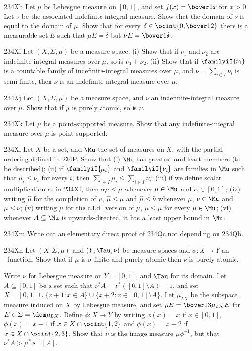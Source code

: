 {\spheader 234Xh
Let $\mu$ be Lebesgue measure on $[0,1]$, and set $f(x)=\bover1x$ for
$x>0$. Let $\nu$ be the associated indefinite-integral measure.   Show
that the
domain of $\nu$ is equal to the domain of $\mu$.   Show that for every
$\delta\in\ocint{0,\bover12}$ there is a measurable set $E$ such that
$\mu E=\delta$ but $\nu E=\bover1{\delta}$.

\spheader 234Xi
 Let $(X,\Sigma,\mu)$ be a measure space.   (i) Show that if
$\nu_1$ and $\nu_2$ are indefinite-integral measures over $\mu$, so is
$\nu_1+\nu_2$.   (ii) Show that if $\familyiI{\nu_i}$ is a countable family
of indefinite-integral measures over $\mu$, and $\nu=\sum_{i\in I}\nu_i$ is
semi-finite, then $\nu$ is an indefinite-integral measure over $\mu$.

\spheader 234Xj
 Let $(X,\Sigma,\mu)$ be a measure space, and $\nu$ an
indefinite-integral measure over $\mu$.   Show that if $\mu$ is purely
atomic, so is $\nu$.

\spheader 234Xk
 Let $\mu$ be a point-supported measure.   Show that any
indefinite-integral measure over $\mu$ is point-supported.

\spheader 234Xl
 Let $X$ be a set, and $\Mu$ the set of measures on $X$,
with the partial ordering defined in 234P.   Show that (i) $\Mu$ has
greatest and least members (to be described);
(ii) if $\familyiI{\mu_i}$
and $\familyiI{\nu_i}$ are families in $\Mu$ such that $\mu_i\le\nu_i$ for
every $i$, then $\sum_{i\in I}\mu_i\le\sum_{i\in I}\nu_i$;   (iii) if we
define scalar multiplication as in 234Xf, then
$\alpha\mu\le\mu$ whenever $\mu\in\Mu$ and $\alpha\in[0,1]$;   (iv) writing
$\hat\mu$ for the completion of $\mu$, $\hat\mu\le\mu$ and
$\hat\mu\le\hat\nu$ whenever $\mu$, $\nu\in\Mu$ and $\mu\le\nu$;  (v)
writing $\tilde\mu$ for the c.l.d.\ version of $\mu$, $\tilde\mu\le\mu$ for
every $\mu\in\Mu$;  (vi) whenever $A\subseteq\Mu$ is upwards-directed, it
has a least upper bound in $\Mu$.

\spheader 234Xm
 Write out an elementary direct proof of 234Qc not depending
on 234Qb.

\spheader 234Xn Let $(X,\Sigma,\mu)$ and
$(Y,\Tau,\nu)$ be measure spaces and $\phi:X\to Y$ an \imp\ function.
Show that if $\mu$ is $\sigma$-finite and purely atomic then
$\nu$ is purely atomic.

Write $\nu$ for Lebesgue measure on
$Y=[0,1]$, and $\Tau$ for its domain.    Let $A\subseteq[0,1]$ be a set
such that $\nu^*A=\nu^*([0,1]\setminus A)=1$, and set
$X=[0,1]\cup\{x+1:x\in A\}\cup\{x+2:x\in[0,1]\setminus A\}$.   Let
$\mu_{LX}$ be the subspace measure induced on $X$ by Lebesgue measure,
and set $\mu E=\bover13\mu_{LX}E$ for $E\in\Sigma=\dom\mu_{LX}$.
Define $\phi:X\to Y$ by writing $\phi(x)=x$ if $x\in[0,1]$,
$\phi(x)=x-1$ if $x\in X\cap\ocint{1,2}$ and $\phi(x)=x-2$ if
$x\in X\cap\ocint{2,3}$.   Show that $\nu$ is the image measure
$\mu\phi^{-1}$, but that $\nu^*A>\mu^*\phi^{-1}[A]$.

}

